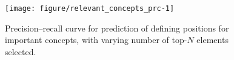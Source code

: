 \begin{knitrout}
\color{fgcolor}\begin{figure}[!htbp]

{\centering \texttt{[image: figure/relevant\_concepts\_prc-1]} 

}

\caption[Precision--recall curve for prediction of defining positions for important concepts, with varying number of top-$N$ elements selected]{Precision--recall curve for prediction of defining positions for important concepts, with varying number of top-$N$ elements selected.}\label{fig:relevant_concepts_prc}
\end{figure}

\end{knitrout}
